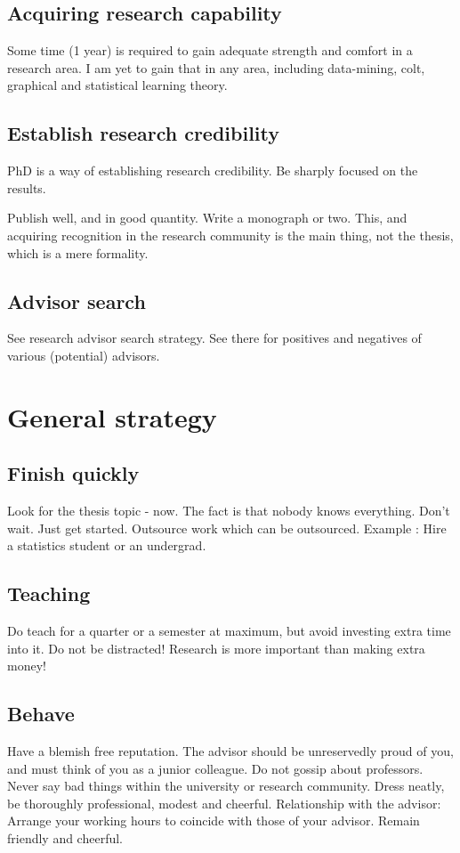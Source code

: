\documentclass[oneside, article]{memoir}
\begin{document}
\subsection{Acquiring research capability}
Some time (1 year) is required to gain adequate strength and comfort in a research area. I am yet to gain that in any area, including data-mining, colt, graphical and statistical learning theory.


\subsection{Establish research credibility}
PhD is a way of establishing research credibility. Be sharply focused on the results.

\subitem Publish well, and in good quantity. Write a monograph or two. This, and acquiring recognition in the research community is the main thing, not the thesis, which is a mere formality.

\subsection{Advisor search}
See research advisor search strategy. See there for positives and negatives of various (potential) advisors.



\section{General strategy}
\subsection{Finish quickly}
\subitem Look for the thesis topic - now.
\subitem The fact is that nobody knows everything. Don't wait. Just get started.
\subitem Outsource work which can be outsourced. Example : Hire a statistics student or an undergrad.

\subsection{Teaching}
\subitem Do teach for a quarter or a semester at maximum, but avoid investing extra time into it. Do not be distracted! Research is more important than making extra money!

\subsection{Behave}
\subitem Have a blemish free reputation. The advisor should be unreservedly proud of you, and must think of you as a junior colleague.
\subitem Do not gossip about professors. Never say bad things within the university or research community.
\subitem Dress neatly, be thoroughly professional, modest and cheerful.
\subitem Relationship with the advisor:
\subsubitem Arrange your working hours to coincide with those of your advisor.
\subitem Remain friendly and cheerful.
\end{document}
